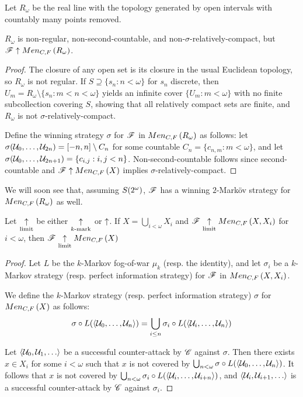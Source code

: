 \begin{defn}
  Let $R_\omega$ be the real line with the topology generated by open
  intervals with countably many points removed.
\end{defn}

\begin{thm}
  $R_\omega$ is non-regular, non-second-countable, and
  non-$\sigma$-relatively-compact, but $\mathscr{F}\uparrow Men_{C,F}\left({R_\omega}\right)$.
\end{thm}

\begin{proof}
  The closure of any open set is its closure in the usual Euclidean topology,
  so $R_\omega$ is not regular. If $S\supseteq\{s_n:n<\omega\}$ for $s_n$
  discrete, then $U_m=R_\omega\setminus\{s_n:m<n<\omega\}$ yields an
  infinite cover $\{U_m:m<\omega\}$ with no finite subcollection covering $S$,
  showing that all relatively compact sets are finite, and $R_\omega$ is not
  $\sigma$-relatively-compact.

  Define the winning strategy $\sigma$ for $\mathscr{F}$ in $Men_{C,F}\left({R_\omega}\right)$ as
  follows: let $\sigma(\mathcal{U}_0,\dots,\mathcal{U}_{2n})=[-n,n]\setminus C_n$
  for some countable $C_n=\{c_{n,m}: m<\omega\}$,
  and let $\sigma(\mathcal{U}_0,\dots,\mathcal{U}_{2n+1})=\{c_{i,j} : i,j < n\}$.
  Non-second-countable follows since
  second-countable and $\mathscr{F}\uparrow Men_{C,F}\left({X}\right)$ implies
  $\sigma$-relatively-compact.
\end{proof}

We will soon see that, assuming $S(2^\omega)$, $\mathscr{F}$ has a winning
$2$-Mark\"ov strategy for $Men_{C,F}\left({R_\omega}\right)$ as well.

\begin{prop}
  Let $\underset{\text{limit}}{\uparrow}$ be either $\underset{k\text{-mark}}{\uparrow}$ or $\uparrow$.
  If $X=\bigcup_{i<\omega} X_i$ and $\mathscr{F} \underset{\text{limit}}{\uparrow} Men_{C,F}\left({X,X_i}\right)$
  for $i<\omega$, then $\mathscr{F} \underset{\text{limit}}{\uparrow} Men_{C,F}\left({X}\right)$
\end{prop}

\begin{proof}
  Let $L$ be the $k$-Markov fog-of-war $\mu_k$ (resp. the identity),
  and let $\sigma_i$ be a $k$-Markov strategy (resp. perfect information
  strategy) for $\mathscr{F}$ in $Men_{C,F}\left({X,X_i}\right)$.

  We define the $k$-Markov strategy (resp. perfect information strategy)
  $\sigma$ for $Men_{C,F}\left({X}\right)$ as follows:
    \[
      \sigma\circ L(\langle\mathcal{U}_0,\dots,\mathcal{U}_n\rangle)
        =
      \bigcup_{i\leq n}
      \sigma_i\circ L(\langle\mathcal{U}_i,\dots,\mathcal{U}_n\rangle)
    \]

  Let $\<\mc U_0,\mc U_1,\dots\>$ be a successful counter-attack by $\mathscr{C}$
  against $\sigma$. Then there exists $x\in X_i$ for
  some $i<\omega$ such that $x$ is not covered by
  $\bigcup_{n<\omega}\sigma\circ L(\langle\mathcal{U}_0,\dots,\mathcal{U}_n\rangle)$.
  It follows that $x$ is not covered by
  $\bigcup_{n<\omega}\sigma_i\circ L(\langle\mathcal{U}_i,\dots,\mathcal{U}_{i+n}\rangle)$,
  and $\<\mc U_i,\mc U_{i+1},\dots\>$ is a successful counter-attack
  by $\mathscr{C}$ against $\sigma_i$.
\end{proof}

